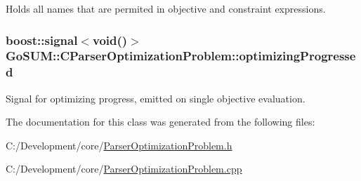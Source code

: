 Holds all names that are permited in objective and constraint expressions. 

\hypertarget{class_go_s_u_m_1_1_c_parser_optimization_problem_aab0e689caaf0806fc8ebbe45f9f7861c}{
\subsubsection[{optimizing\-Progressed}]{\setlength{\rightskip}{0pt plus 5cm}boost\-::signal$<$void()$>$ Go\-S\-U\-M\-::\-C\-Parser\-Optimization\-Problem\-::optimizing\-Progressed}}\label{class_go_s_u_m_1_1_c_parser_optimization_problem_aab0e689caaf0806fc8ebbe45f9f7861c}


Signal for optimizing progress, emitted on single objective evaluation. 



The documentation for this class was generated from the following files\-:\begin{DoxyCompactItemize}
\item 
C\-:/\-Development/core/\hyperlink{_parser_optimization_problem_8h}{Parser\-Optimization\-Problem.\-h}\item 
C\-:/\-Development/core/\hyperlink{_parser_optimization_problem_8cpp}{Parser\-Optimization\-Problem.\-cpp}\end{DoxyCompactItemize}
